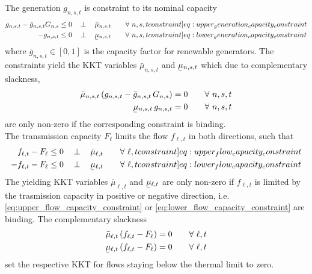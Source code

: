 \documentclass[11pt]{article}
\newcommand{\ubar}[1]{\underaccent{\bar}{#1}}
\newcommand{\generation}[1][n]{g_{#1,s,t}}
\newcommand{\generationpotential}{\bar{g}_{n,s,t}}
\newcommand{\capacityGeneration}{G_{n,s}}
\newcommand{\capacityFlow}{F_{\ell}}
\newcommand{\mulowergeneration}[1][n]{\ubar{\mu}_{#1,s,t}}
\newcommand{\muuppergeneration}[1][n]{\bar{\mu}_{#1,s,t}}
\newcommand{\mulowerflow}{\ubar{\mu}_{\ell,t}}
\newcommand{\muupperflow}{\bar{\mu}_{\ell,t}}
\newcommand{\flow}{f_{\ell,t}}
\newcommand{\resultsin}[1]{\hspace{12pt} \bot  \hspace{12pt} #1}
\newcommand{\Forall}[1]{\hspace{20pt} \forall \,\, #1 }
\begin{document}
The generation $\generation$ is constraint to its nominal capacity
\begin{align}
 \generation - \generationpotential \capacityGeneration  &\le 0 \resultsin{\muuppergeneration} \Forall{n,s,t} 
 \label[constraint]{eq:upper_generation_capacity_constraint}\\ 
 - \generation &\le 0 \resultsin{\mulowergeneration} \Forall{n,s,t} 
 \label[constraint]{eq:lower_generation_capacity_constraint}
 \end{align}
where $\generationpotential \in \left[ 0,1\right]$ is the capacity factor for renewable generators. The constraints yield the KKT variables $\muuppergeneration$ and $\mulowergeneration$ which due to complementary slackness,
\begin{align}
\muuppergeneration \left( \generation - \generationpotential \, \capacityGeneration \right)  &= 0  \Forall{n,s,t} 
\label{eq:complementary_slackness_upper_generation} \\
\mulowergeneration  \, \generation &= 0 \Forall{n,s,t}
\label{eq:complementary_slackness_lower_generation} 
\end{align}
are only non-zero if the corresponding constraint is binding. \\


The transmission capacity $\capacityFlow$ limits the flow $\flow$ in both directions, such that 
\begin{align}
 \flow - \capacityFlow &\le 0 \resultsin{\muupperflow} \Forall{\ell,t} 
 \label[constraint]{eq:upper_flow_capacity_constraint} \\
 - \flow - \capacityFlow &\le 0 \resultsin{\mulowerflow} \Forall{\ell,t} 
 \label[constraint]{eq:lower_flow_capacity_constraint}
\end{align}
The yielding KKT variables $\muupperflow$ and $\mulowerflow$ are only non-zero if $\flow$ is limited by the trasmission capacity in positive or negative direction, i.e. \cref{eq:upper_flow_capacity_constraint} or \cref{eq:lower_flow_capacity_constraint} are binding. The complementary slackness 
\begin{align}
 \muupperflow \left( \flow - \capacityFlow \right)  &= 0 \Forall{\ell,t}
 \label{eq:complementary_slackness_upper_flow} \\
 \mulowerflow \left( \flow - \capacityFlow \right) &=  0 \Forall{\ell,t}
 \label{eq:complementary_slackness_lower_flow} 
\end{align}
set the respective KKT for flows staying below the thermal limit to zero. 
\\
\end{document}
